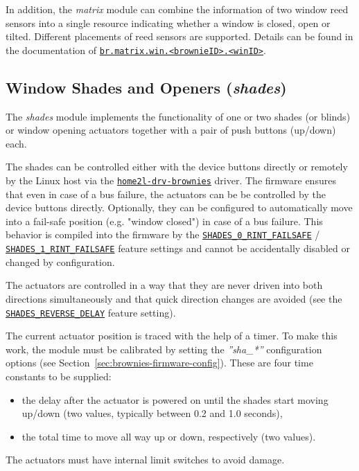 \documentclass[12pt,english,parskip=half,headheight=19pt]{scrreprt}
\newcommand{\idx}[1]{#1\index{#1}}
\newcommand{\refenv}[1]{\hyperref[env:#1]{\texttt{#1}}}        %
\newcommand{\reftool}[1]{\hyperref[tool:#1]{\texttt{\idx{#1}}}}
\newcommand{\refapic}[1]{\href{home2l-api_c/index.html}{\mbox{\texttt{#1}}}}            %
\begin{document}
In addition, the \textit{matrix} module can combine the information of two window reed sensors into a single resource indicating whether a window is closed, open or tilted. Different placements of reed sensors are supported. Details can be found in the documentation of \refenv{br.matrix.win.<brownieID>.<winID>}.



\subsection{Window Shades and Openers (\textit{shades})}
\label{sec:brownies-features-shades}

The \textit{shades} module implements the functionality of one or two shades (or blinds) or window opening actuators together with a pair of push buttons (up/down) each.

The shades can be controlled either with the device buttons directly or remotely by the Linux host via the \reftool{home2l-drv-brownies} driver. The firmware ensures that even in case of a bus failure, the actuators can be be controlled by the device buttons directly. Optionally, they can be configured to automatically move into a fail-safe position (e.g. "window closed") in case of a bus failure. This behavior is compiled into the firmware by the \refapic{SHADES\_0\_RINT\_FAILSAFE} / \refapic{SHADES\_1\_RINT\_FAILSAFE} feature settings and cannot be accidentally disabled or changed by configuration.

The actuators are controlled in a way that they are never driven into both directions simultaneously and that quick direction changes are avoided (see the \refapic{SHADES\_REVERSE\_DELAY} feature setting).

The current actuator position is traced with the help of a timer. To make this work, the module must be calibrated by setting the \textit{''sha\_*''} configuration options (see Section~\ref{sec:brownies-firmware-config}). These are four time constants to be supplied:
\begin{itemize}
  \item the delay after the actuator is powered on until the shades start moving up/down
        (two values, typically between 0.2 and 1.0 seconds),
  \item the total time to move all way up or down, respectively (two values).
\end{itemize}

The actuators must have internal limit switches to avoid damage.
\end{document}
